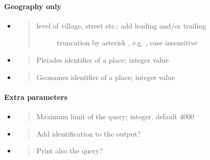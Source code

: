 \documentclass[a4paper,12pt,english]{sphinxhowto}
\begin{document}
\paragraph{Geography only}
\label{\detokenize{Epigraphic:geography-only}}\begin{itemize}
\item {} 
\begin{quote}
\begin{description}
\item[{level of village, street etc.; add leading and/or trailing}] \leavevmode
truncation by asterisk \sphinxcode{\sphinxupquote{\textbackslash{}*}}, e.g. , case
insensitive

\end{description}
\end{quote}

\item {} 
\begin{quote}

Pleiades identifier of a place; integer value
\end{quote}

\item {} 
\begin{quote}

Geonames identifier of a place; integer value
\end{quote}

\end{itemize}



\paragraph{Extra parameters}
\label{\detokenize{Epigraphic:extra-parameters}}\begin{itemize}
\item {} 
\begin{quote}

Maximum limit of the query; integer, default 4000
\end{quote}

\item {} 
\begin{quote}

Add identification to the output?
\end{quote}

\item {} 
\begin{quote}

Print also the query?
\end{quote}

\end{itemize}
\end{document}
